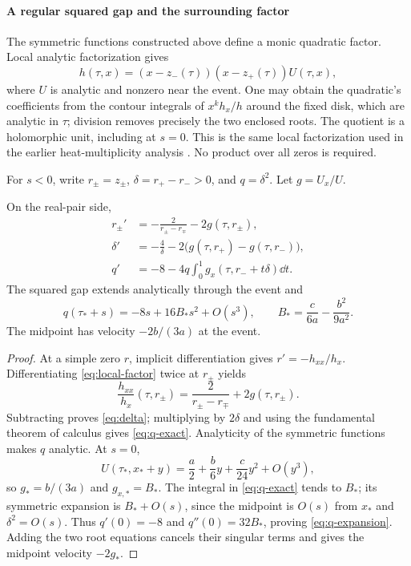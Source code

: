 \paragraph{A regular squared gap and the surrounding factor}
The symmetric functions constructed above define a monic quadratic
factor. Local analytic factorization gives
\begin{equation}\label{eq:local-factor}
 h(\tau,x)=(x-z_-(\tau))(x-z_+(\tau))U(\tau,x),
\end{equation}
where \(U\) is analytic and nonzero near the event. One may obtain the
quadratic's coefficients from the contour integrals of
\(x^k h_x/h\) around the fixed disk, which are analytic in \(\tau\);
division removes precisely the two enclosed roots. The quotient is a
holomorphic unit, including at \(s=0\). This is the same local
factorization used in the earlier heat-multiplicity analysis
\cite{HeatMultiplicity}. No product over all zeros is required.

For \(s<0\), write \(r_\pm=z_\pm\), \(\delta=r_+-r_->0\), and
\(q=\delta^2\). Let \(g=U_x/U\).

\begin{proposition}\label{prop:gap}
On the real-pair side,
\begin{align}
 r_\pm'&=-\frac{2}{r_\pm-r_\mp}-2g(\tau,r_\pm),\label{eq:pair-motion}\\
 \delta'&=-\frac4\delta-2\bigl(g(\tau,r_+)-g(\tau,r_-)\bigr),\label{eq:delta}\\
 q'&=-8-4q\int_0^1g_x(\tau,r_-+t\delta)\dd t.\label{eq:q-exact}
\end{align}
The squared gap extends analytically through the event and
\begin{equation}\label{eq:q-expansion}
 q(\tau_*+s)=-8s+16B_*s^2+O(s^3),\qquad
 B_*=\frac{c}{6a}-\frac{b^2}{9a^2}.
\end{equation}
The midpoint has velocity \(-2b/(3a)\) at the event.
\end{proposition}
\begin{proof}
At a simple zero \(r\), implicit differentiation gives
\(r'=-h_{xx}/h_x\). Differentiating \eqref{eq:local-factor} twice
at \(r_\pm\) yields
\[
 \frac{h_{xx}}{h_x}(\tau,r_\pm)
 =\frac{2}{r_\pm-r_\mp}+2g(\tau,r_\pm).
\]
Subtracting proves \eqref{eq:delta}; multiplying by \(2\delta\) and
using the fundamental theorem of calculus gives \eqref{eq:q-exact}.
Analyticity of the symmetric functions makes \(q\) analytic.
At \(s=0\),
\[
 U(\tau_*,x_*+y)=\frac a2+\frac b6y+\frac c{24}y^2+O(y^3),
\]
so \(g_*=b/(3a)\) and \(g_{x,*}=B_*\).
The integral in \eqref{eq:q-exact} tends to \(B_*\); its symmetric
expansion is \(B_*+O(s)\), since the midpoint is \(O(s)\) from \(x_*\)
and \(\delta^2=O(s)\). Thus \(q'(0)=-8\) and \(q''(0)=32B_*\),
proving \eqref{eq:q-expansion}. Adding the two root equations cancels
their singular terms and gives the midpoint velocity \(-2g_*\).
\end{proof}

